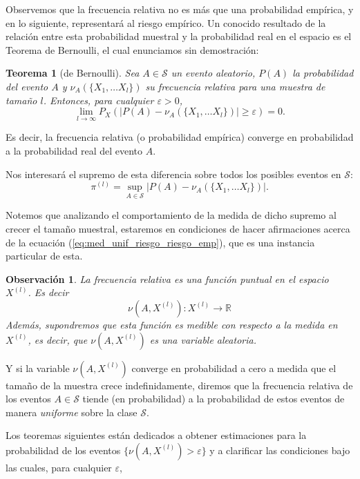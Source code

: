 \documentclass{report}
\newtheorem{thm}{Teorema}[subsection]
\newtheorem{obs}{Observación}[subsection]
\begin{document}
Observemos que la frecuencia relativa no es más que una probabilidad empírica, y en lo siguiente, representará al riesgo
empírico. Un conocido resultado de la relación entre esta probabilidad muestral y la probabilidad real en el espacio
es el Teorema de Bernoulli, el cual enunciamos sin demostración:
\bigskip
\begin{thm}[de Bernoulli]
Sea \( A \in \mathcal{S} \) un evento aleatorio, $P(A)$ la probabilidad del evento $A$ y $\nu_A(\{X_1,\dots X_l\})$ su frecuencia relativa para una muestra de
tamaño $l$. Entonces, para cualquier $\varepsilon > 0$,
\[
    \lim_{l\to\infty} P_X\left(| P(A)-\nu_A(\{X_1,\dots X_l\})| \geq \varepsilon\right) = 0.
\]
\end{thm}

Es decir, la frecuencia relativa (o probabilidad empírica) converge en probabilidad a la probabilidad real del evento $A$.\newline

Nos interesará el supremo de esta diferencia sobre todos los posibles eventos en $\mathcal{S}$:
\begin{equation}
    \pi^{(l)} = \sup_{A\in\mathcal{S}} |P(A)-\nu_A(\{X_1,\dots X_l\})|. \label{def: funcion pi}
\end{equation}

Notemos que analizando el comportamiento de la medida de dicho supremo al crecer el tamaño muestral, 
estaremos en condiciones de hacer afirmaciones acerca de la ecuación (\ref{eq:med_unif_riesgo_riesgo_emp}),
que es una instancia particular de esta.\newline

\begin{obs}
La frecuencia relativa es una función puntual en el espacio \( X^{(l)} \). Es decir
\[ \nu(A, X^{(l)}): X^{(l)} \rightarrow \mathbb{R}
\]
Además, supondremos que esta función es medible con respecto a la medida en \( X^{(l)} \), 
es decir, que \( \nu(A, X^{(l)}) \) es una variable aleatoria.
\end{obs} 

Y si la variable \( \nu(A, X^{(l)}) \) converge en probabilidad a cero a medida que 
el tamaño de la muestra crece indefinidamente, diremos que la frecuencia relativa 
de los eventos \( A \in \mathcal{S} \) tiende (en probabilidad) a la probabilidad 
de estos eventos de manera \textit{uniforme} sobre la clase \( \mathcal{S} \).\newline

Los teoremas siguientes están dedicados a obtener estimaciones para la probabilidad 
de los eventos \( \{ \nu(A, X^{(l)}) > \varepsilon \} \) y a clarificar las condiciones 
bajo las cuales, para cualquier \( \varepsilon \),
\end{document}
